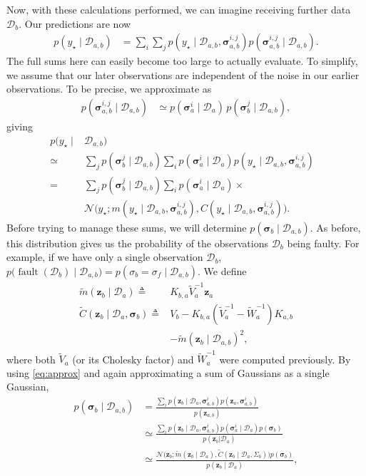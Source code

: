 \documentclass{article}
\newcommand{\given}{\ensuremath{\mid}}
\newcommand{\cm}[1]{\ensuremath{\mathcal{#1}}}
\newcommand{\bm}[1]{\ensuremath{\mathbf{#1}}}
\newcommand{\data}{\ensuremath{\cm{D}}}
\newcommand{\vect}[1]{\bm{#1}}
\newcommand{\vz}{\vect{z}}
\newcommand{\vs}{\vect{\sigma}}
\newcommand{\amean}[2]{\tilde{{m}}(#1 \given #2 )}
\newcommand{\acov}[2]{\tilde{{C}}(#1 \given #2 )}
\newcommand{\p}[2]{p(#1 \given #2 )}
\newcommand{\fPr}{p}
\newcommand{\Prob}[2]{\fPr(#1 \given #2 )}
\newcommand{\ps}[2]{p(#1\vert#2)}
\newcommand{\mean}[2]{{m}(#1 \given #2 )}
\newcommand{\cov}[2]{{C}(#1 \given #2 )}
\newcommand{\st}{_{\star}}
\newcommand{\defequal}{\triangleq}
\DeclareMathOperator{\fault}{fault}
\begin{document}
Now, with these calculations performed, we can imagine receiving
further data $\data_b$. Our predictions are now
\begin{align*}
\p{y\st}{\data_{a,b}} & = \sum_{i} \sum_{j} \p{y\st}{\data_{a,b}, \vs^{i,j}_{a,b}} \Prob{\vs^{i,j}_{a,b}}{\data_{a,b}}.
\end{align*}
The full sums here can easily become too large to actually
evaluate. To simplify, we assume that our later observations are
independent of the noise in our earlier observations. To be precise, we approximate as
\begin{align} \label{eq:approx}
\Prob{\vs^{i,j}_{a,b}}{\data_{a,b}} & \simeq \Prob{\vs^i_{a}}{\data_a}\,\Prob{\vs^j_{b}}{\data_{a,b}},
\end{align}
giving
\begin{align}
p(y\st \given& \data_{a,b}) &\nonumber\\
\simeq {}& \sum_{j} \Prob{\vs^j_{b}}{\data_{a,b}}\sum_{i} \Prob{\vs^i_{a}}{\data_a} \p{y\st}{\data_{a,b}, \vs^{i,j}_{a,b}}\nonumber\\
= {}&\sum_{j} \Prob{\vs^j_{b}}{\data_{a,b}}\sum_{i} \Prob{\vs^i_{a}}{\data_a}\times {}\nonumber 
\\
& \cm{N}\bigl(y\st; \mean{y\st}{\data_{a,b}, \vs^{i,j}_{a,b}}, \cov{y\st}{\data_{a,b}, \vs^{i,j}_{a,b}}\bigr).\label{eq:sum_o_Gaussians}
\end{align}
Before trying to manage these sums, we will determine $p(\vs_b \given
\data_{a,b})$. As before, this distribution gives us the probability
of the observations $\data_b$ being faulty. For example, if we have
only a single observation $\data_b$, $
p\bigl(\fault(\data_b) \given \data_{a,b}\bigr) = \Prob{\sigma_b =
  \sigma_f}{\data_{a,b}} $. We define
\begin{align*}
\amean{\vz_b}{\data_a} \defequal {} &
K_{b,a} \tilde{V}_a^{-1} \vz_a %
\\
\acov{\vz_b}{\data_{a},\vs_b}
\defequal {} & V_b - K_{b,a}(\tilde{V}_a^{-1}-\tilde{W}_a^{-1})K_{a,b}
\nonumber\\
& - \amean{\vz_b}{\data_{a,b}}^2, %
\end{align*}
where both $\tilde{V}_a$ (or its Cholesky factor) and
$\tilde{W}_a^{-1}$ were computed previously. By using
\eqref{eq:approx} and again approximating a sum of Gaussians as a
single Gaussian,
\begin{align*}
\Prob{\vs_b}{\data_{a,b}} & = \frac{\sum_i \p{\vz_b}{\data_a,\vs^i_{a,b}}p(\vz_a,\vs^i_{a,b})}{p(\vz_{a,b})}\nonumber\\
& \simeq \frac{\sum_i \p{\vz_b}{\data_a,\vs^i_{a,b}}\fPr(\vs_a^i\mid{\data_a})\fPr(\vs_{b})}{\ps{\vz_{b}}{\data_a}}\nonumber\\
& \simeq \frac{\cm{N}\bigl(\vz_b; \amean{\vz_b}{\data_a}, \acov{\vz_b}{\data_a, \Sigma_b}\bigr) \fPr(\vs_b)}{\p{\vz_{b}}{\data_a}},%
\end{align*}
\end{document}

